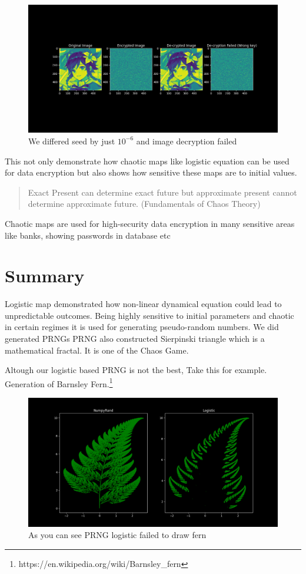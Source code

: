 \documentclass{report}
\begin{document}
\begin{figure}[!h]
    \centering
    \includegraphics[scale=.4]{images/imageed.png}
    \caption{We differed seed by just $10^{-6}$ and image decryption failed}
    \label{fig:my_labelVenti}
\end{figure}

This not only demonstrate how chaotic maps like logistic equation can be used for data encryption but also shows how sensitive these maps are to initial values.
\begin{quote}
Exact Present can determine exact future but approximate present cannot determine approximate future.  (Fundamentals of Chaos Theory)
\end{quote}

Chaotic maps are used for high-security data encryption in many sensitive areas like banks, showing passwords in database etc


\newpage
\section{Summary}
Logistic map demonstrated how non-linear dynamical equation could lead to unpredictable outcomes. Being highly sensitive to  initial parameters and chaotic in certain regimes it is used for generating pseudo-random numbers. We did generated PRNGs
\newline
PRNG also constructed Sierpinski triangle which is a mathematical fractal. It is one of the Chaos Game.

Altough our logistic based PRNG is not the best, Take this for example. Generation of Barnsley Fern.\footnote[1]{https://en.wikipedia.org/wiki/Barnsley\_fern}
\begin{figure}[!h]
    \centering
    \includegraphics[scale=.3]{images/badfern.png}
    \caption{As you can see PRNG logistic failed to draw fern}
    \label{fig:my_label13}
\end{figure}
\end{document}
